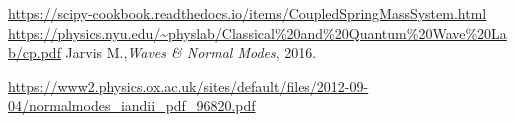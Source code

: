 \documentclass[%
 aip,
rsi,%
 amsmath,amssymb,
 reprint,%
]{revtex4-1}
\begin{document}
\begin{thebibliography}{10}

\url{https://scipy-cookbook.readthedocs.io/items/CoupledSpringMassSystem.html}
\url{https://physics.nyu.edu/~physlab/Classical%20and%20Quantum%20Wave%20Lab/cp.pdf}
Jarvis M.,{\it Waves \& Normal Modes}, 2016.

\url{https://www2.physics.ox.ac.uk/sites/default/files/2012-09-04/normalmodes_iandii_pdf_96820.pdf}
\end{thebibliography}
\end{document}
